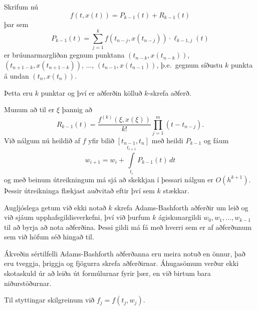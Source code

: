 \documentclass[icelandic,a4paper,12pt]{article}
\begin{document}
\pause
Skrifum nú
\begin{equation*}
  f(t,x(t)) = P_{k-1}(t) + R_{k-1}(t)
\end{equation*}
þar sem
\begin{equation*}
  P_{k-1}(t) = \sum\limits_{j=1}^k f(t_{n-j},x(t_{n-j})) \cdot
  \ell_{k-1,j}(t)
\end{equation*}
er brúunarmargliðan gegnum punktana $(t_{n-k},x(t_{n-k}))$,
$(t_{n+1-k},x(t_{n+1-k}))$, $\ldots$, $(t_{n-1},x(t_{n-1}))$,
þ.e.~gegnum síðustu $k$ punkta á undan $(t_n,x(t_n))$. 

Þetta eru $k$ punktar og því er aðferðin kölluð $k$-skrefa
aðferð. 



Munum að til er  $\xi$ þannig að 
\begin{equation*}
  R_{k-1}(t) = \frac{f^{(k)}(\xi,x(\xi))}{k!}
  \prod\limits_{j=1}^m (t-t_{n-j}).
\end{equation*}
Við nálgum nú heildið af $f$ yfir bilið 
$[t_{n-1},t_n]$ með heildi $P_{k-1}$ og fáum
\begin{equation*}
  w_{i+1} = w_i +
  \int\limits_{t_i}^{t_{i+1}} P_{k-1}(t) \, dt
\end{equation*}
og með beinum  útreikningum má sjá að skekkjan í þessari nálgun er 
$O(h^{k+1})$.  Þessir útreikninga flækjast auðvitað eftir því sem 
$k$ stækkar.



Augljóslega getum við ekki notað $k$ skrefa Adams-Bashforth aðferðir
um leið og við sjáum upphafsgildisverkefni, því við þurfum $k$
ágiskunargildi $w_0, w_1, \ldots, w_{k-1}$ til að byrja að nota
aðferðina. Þessi gildi má fá með hverri sem er af aðferðunum sem við
höfum séð hingað til. 

\pause
\smallskip
Ákveðin sértilfelli Adams-Bashforth aðferðanna eru meira notuð en
önnur, það eru tveggja, þriggja og fjögurra skrefa
aðferðirnar. Áhugasömum verður ekki skotaskuld úr að leiða út
formúlurnar fyrir þær, en við birtum bara niðurstöðurnar. 

\pause
\smallskip
Til styttingar skilgreinum við  $f_j = f(t_j,w_j)$.
\end{document}
